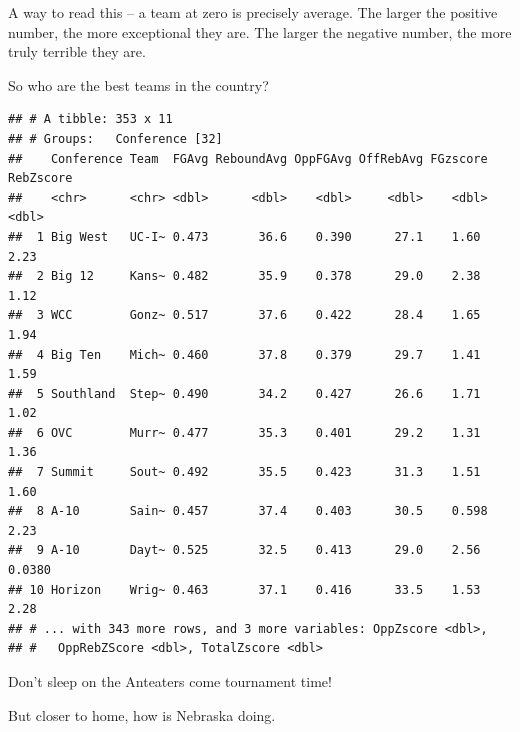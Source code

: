 \documentclass[]{book}
\newenvironment{Shaded}{\begin{snugshade}}{\end{snugshade}}
\newcommand{\KeywordTok}[1]{\textcolor[rgb]{0.13,0.29,0.53}{\textbf{#1}}}
\newcommand{\NormalTok}[1]{#1}
\newcommand{\OperatorTok}[1]{\textcolor[rgb]{0.81,0.36,0.00}{\textbf{#1}}}
\newcommand{\StringTok}[1]{\textcolor[rgb]{0.31,0.60,0.02}{#1}}
\begin{document}
A way to read this -- a team at zero is precisely average. The larger the positive number, the more exceptional they are. The larger the negative number, the more truly terrible they are.

So who are the best teams in the country?

\begin{Shaded}
\end{Shaded}

\begin{verbatim}
## # A tibble: 353 x 11
## # Groups:   Conference [32]
##    Conference Team  FGAvg ReboundAvg OppFGAvg OffRebAvg FGzscore RebZscore
##    <chr>      <chr> <dbl>      <dbl>    <dbl>     <dbl>    <dbl>     <dbl>
##  1 Big West   UC-I~ 0.473       36.6    0.390      27.1    1.60     2.23  
##  2 Big 12     Kans~ 0.482       35.9    0.378      29.0    2.38     1.12  
##  3 WCC        Gonz~ 0.517       37.6    0.422      28.4    1.65     1.94  
##  4 Big Ten    Mich~ 0.460       37.8    0.379      29.7    1.41     1.59  
##  5 Southland  Step~ 0.490       34.2    0.427      26.6    1.71     1.02  
##  6 OVC        Murr~ 0.477       35.3    0.401      29.2    1.31     1.36  
##  7 Summit     Sout~ 0.492       35.5    0.423      31.3    1.51     1.60  
##  8 A-10       Sain~ 0.457       37.4    0.403      30.5    0.598    2.23  
##  9 A-10       Dayt~ 0.525       32.5    0.413      29.0    2.56     0.0380
## 10 Horizon    Wrig~ 0.463       37.1    0.416      33.5    1.53     2.28  
## # ... with 343 more rows, and 3 more variables: OppZscore <dbl>,
## #   OppRebZScore <dbl>, TotalZscore <dbl>
\end{verbatim}

Don't sleep on the Anteaters come tournament time!

But closer to home, how is Nebraska doing.

\begin{Shaded}
\end{Shaded}
\end{document}
